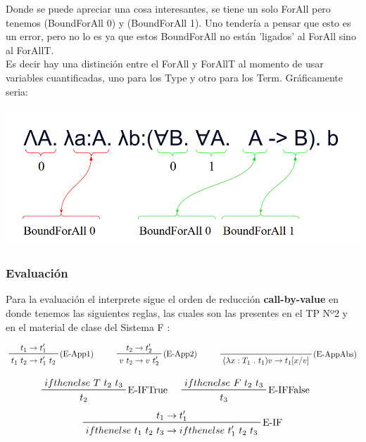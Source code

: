 \documentclass[12pt, titlepage, a4paper]{article}
\begin{document}
Donde se puede apreciar una cosa interesantes, se tiene un solo ForAll pero tenemos (BoundForAll 0) y (BoundForAll 1). Uno tendería a 
pensar que esto es un error, pero no lo es ya que estos BoundForAll no están 'ligados' al ForAll sino al ForAllT.\\

Es decir hay una distinción entre el ForAll y ForAllT al momento de usar variables cuantificadas, uno para los Type y otro para 
los Term. Gráficamente seria:

\begin{center}
  \includegraphics[width=1\textwidth]{Imagenes/EjemploBoundForAllFunction.png}
\end{center}

\subsubsection{Evaluación}
Para la evaluación el interprete sigue el orden de reducción \textbf{call-by-value} en donde tenemos las siguientes reglas, las cuales 
son las presentes en el TP Nº2 \cite{tp2:lambdaCalculoSimpleTipado} y en el material de clase del Sistema F \cite{ALP:Polimorfismo}:

\begin{displaymath}
    \prftree[r]{(E-App1)}{t_1 \rightarrow t_1'}{t_1 \ t_2 \rightarrow t_1' \ t_2}  \hspace{1cm}
    \prftree[r]{(E-App2)}{t_2 \rightarrow t_2'}{v \ t_2 \rightarrow v \ t_2'}  \hspace{1cm}
    \prftree[r]{(E-AppAbs)}{}{(\lambda x : T_1 \ . \ t_1 ) v \rightarrow t_1[x/v]}
\end{displaymath}

\begin{displaymath}
    \prftree[r]{E-IFTrue}{ifthenelse \ T \ t_2 \ t_3}{t_2} \hspace{0.5cm}
    \prftree[r]{E-IFFalse}{ifthenelse \ F \ t_2 \ t_3}{t_3} \hspace{0.5cm}
\end{displaymath}
\begin{displaymath}
    \prftree[r]{E-IF}{t_1 \rightarrow t_1'}{ifthenelse \ t_1 \ t_2 \ t_3 \rightarrow ifthenelse \ t_1' \ t_2 \ t_3}
\end{displaymath}
\end{document}
